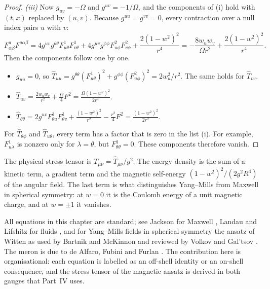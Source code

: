 \begin{proof}
\emph{(iii)} Now $g_{uv}=-\Omega$ and $g^{uv}=-1/\Omega$, and the components of (i) hold with $(t,x)$ replaced by $(u,v)$. Because $g^{uu}=g^{vv}=0$, every contraction over a null index pairs $u$ with $v$:
\[
F^a_{\alpha\beta}F^{a\alpha\beta}=4g^{uv}g^{\theta\theta}F^1_{u\theta}F^1_{v\theta}+4g^{uv}g^{\phi\phi}F^2_{u\phi}F^2_{v\phi}+\frac{2(1-w^2)^2}{r^4}=-\frac{8w_uw_v}{\Omega r^2}+\frac{2(1-w^2)^2}{r^4}.
\]
Then the components follow one by one.
\begin{itemize}[nosep]
\item $g_{uu}=0$, so $\hat T_{uu}=g^{\theta\theta}(F^1_{u\theta})^2+g^{\phi\phi}(F^2_{u\phi})^2=2w_u^2/r^2$. The same holds for $\hat T_{vv}$.
\item $\hat T_{uv}=\frac{2w_uw_v}{r^2}+\frac\Omega4F^2=\frac{\Omega(1-w^2)^2}{2r^4}$.
\item $\hat T_{\theta\theta}=2g^{uv}F^1_{\theta u}F^1_{\theta v}+\frac{(1-w^2)^2}{r^2}-\frac{r^2}4F^2=\frac{(1-w^2)^2}{2r^2}$.
\end{itemize}
For $\hat T_{\theta\phi}$ and $\hat T_{u\theta}$, every term has a factor that is zero in the list (i). For example, $F^1_{u\lambda}$ is nonzero only for $\lambda=\theta$, but $F^1_{\theta\theta}=0$. These components therefore vanish.
\end{proof}


The physical stress tensor is $T_{\mu\nu}=\hat T_{\mu\nu}/g^2$. The energy density is the sum of a kinetic term, a gradient term and the magnetic self-energy $(1-w^2)^2/(2g^2R^4)$ of the angular field. The last term is what distinguishes Yang--Mills from Maxwell in spherical symmetry: at $w=0$ it is the Coulomb energy of a unit magnetic charge, and at $w=\pm1$ it vanishes.

\begin{litbox}
All equations in this chapter are standard; see Jackson for Maxwell \cite{Jackson}, Landau and Lifshitz for fluids \cite{LandauFluid}, and for Yang--Mills fields in spherical symmetry the ansatz of Witten \cite{Witten1977} as used by Bartnik and McKinnon \cite{BartnikMcKinnon1988} and reviewed by Volkov and Gal'tsov \cite{VolkovGaltsov1999}. The meron is due to de Alfaro, Fubini and Furlan \cite{deAlfaroFubiniFurlan1976}. The contribution here is organisational: each equation is labelled as an off-shell identity or an on-shell consequence, and the stress tensor of the magnetic ansatz is derived in both gauges that Part~IV uses.
\end{litbox}

